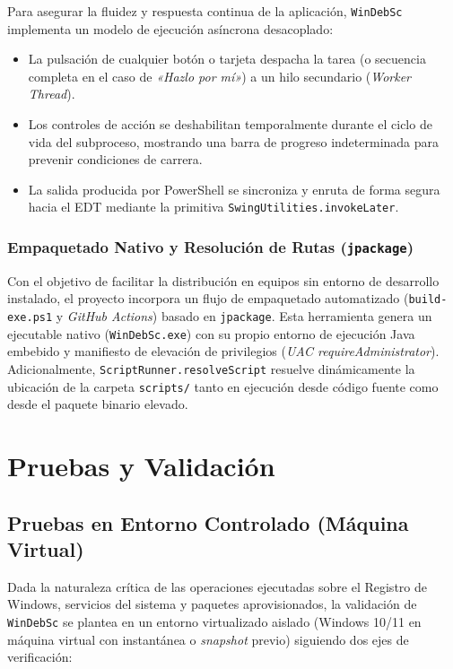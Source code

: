 \documentclass[12pt,a4paper]{report}
\begin{document}
Para asegurar la fluidez y respuesta continua de la aplicación, \texttt{WinDebSc} implementa un modelo de ejecución asíncrona desacoplado:
\begin{itemize}
    \item La pulsación de cualquier botón o tarjeta despacha la tarea (o secuencia completa en el caso de \textit{«Hazlo por mí»}) a un hilo secundario (\textit{Worker Thread}).
    \item Los controles de acción se deshabilitan temporalmente durante el ciclo de vida del subproceso, mostrando una barra de progreso indeterminada para prevenir condiciones de carrera.
    \item La salida producida por PowerShell se sincroniza y enruta de forma segura hacia el EDT mediante la primitiva \texttt{SwingUtilities.invokeLater}.
\end{itemize}

\subsection{Empaquetado Nativo y Resolución de Rutas (\texttt{jpackage})}
Con el objetivo de facilitar la distribución en equipos sin entorno de desarrollo instalado, el proyecto incorpora un flujo de empaquetado automatizado (\texttt{build-exe.ps1} y \textit{GitHub Actions}) basado en \texttt{jpackage}. Esta herramienta genera un ejecutable nativo (\texttt{WinDebSc.exe}) con su propio entorno de ejecución Java embebido y manifiesto de elevación de privilegios (\textit{UAC requireAdministrator}). Adicionalmente, \texttt{ScriptRunner.resolveScript} resuelve dinámicamente la ubicación de la carpeta \texttt{scripts/} tanto en ejecución desde código fuente como desde el paquete binario elevado.

\chapter{Pruebas y Validación}
\section{Pruebas en Entorno Controlado (Máquina Virtual)}
Dada la naturaleza crítica de las operaciones ejecutadas sobre el Registro de Windows, servicios del sistema y paquetes aprovisionados, la validación de \texttt{WinDebSc} se plantea en un entorno virtualizado aislado (Windows 10/11 en máquina virtual con instantánea o \textit{snapshot} previo) siguiendo dos ejes de verificación:
\end{document}
